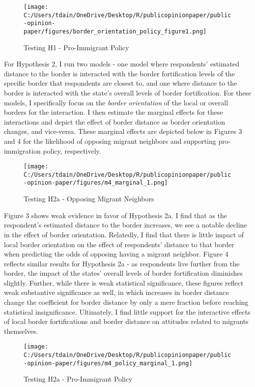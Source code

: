 \documentclass[12pt,]{article}
\begin{document}
\begin{figure}
\centering
\texttt{[image: C:/Users/tdain/OneDrive/Desktop/R/publicopinionpaper/public-opinion-paper/figures/border\_orientation\_policy\_figure1.png]}
\caption{Testing H1 - Pro-Immigrant Policy}
\end{figure}

For Hypothesis 2, I run two models - one model where respondents'
estimated distance to the border is interacted with the border
fortification levels of the specific border that respondents are closest
to, and one where distance to the border is interacted with the state's
overall levels of border fortification. For these models, I specifically
focus on the \emph{border orientation} of the local or overall borders
for the interaction. I then estimate the marginal effects for these
interactions and depict the effect of border distance as border
orientation changes, and vice-versa. These marginal effects are depicted
below in Figures 3 and 4 for the likelihood of opposing migrant
neighbors and supporting pro-immigration policy, respectively.

\begin{figure}
\centering
\texttt{[image: C:/Users/tdain/OneDrive/Desktop/R/publicopinionpaper/public-opinion-paper/figures/m4\_marginal\_1.png]}
\caption{Testing H2a - Opposing Migrant Neighbors}
\end{figure}

Figure 3 shows weak evidence in favor of Hypothesis 2a. I find that as
the respondent's estimated distance to the border increases, we see a
notable decline in the effect of border orientation. Relatedly, I find
that there is little impact of local border orientation on the effect of
respondents' distance to that border when predicting the odds of
opposing having a migrant neighbor. Figure 4 reflects similar results
for Hypothesis 2a - as respondents live further from the border, the
impact of the states' overall levels of border fortification diminishes
slightly. Further, while there is weak statistical significance, these
figures reflect weak substantive significance as well, in which
increases in border distance change the coefficient for border distance
by only a mere fraction before reaching statistical insignificance.
Ultimately, I find little support for the interactive effects of local
border fortifications and border distance on attitudes related to
migrants themselves.

\begin{figure}
\centering
\texttt{[image: C:/Users/tdain/OneDrive/Desktop/R/publicopinionpaper/public-opinion-paper/figures/m4\_policy\_marginal\_1.png]}
\caption{Testing H2a - Pro-Immigrant Policy}
\end{figure}
\end{document}
